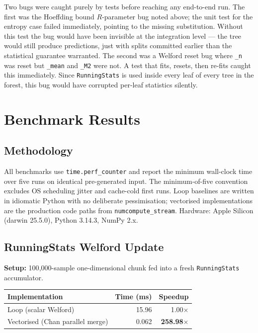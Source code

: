 \documentclass[10pt,a4paper]{article}
\begin{document}
Two bugs were caught purely by tests before reaching any end-to-end run. The first was the Hoeffding bound $R$-parameter bug noted above; the unit test for the entropy case failed immediately, pointing to the missing substitution. Without this test the bug would have been invisible at the integration level --- the tree would still produce predictions, just with splits committed earlier than the statistical guarantee warranted. The second was a Welford reset bug where \texttt{\_n} was reset but \texttt{\_mean} and \texttt{\_M2} were not. A test that fits, resets, then re-fits caught this immediately. Since \texttt{RunningStats} is used inside every leaf of every tree in the forest, this bug would have corrupted per-leaf statistics silently.

\section{Benchmark Results}

\subsection{Methodology}

All benchmarks use \texttt{time.perf\_counter} and report the minimum wall-clock time over five runs on identical pre-generated input. The minimum-of-five convention excludes OS scheduling jitter and cache-cold first runs. Loop baselines are written in idiomatic Python with no deliberate pessimisation; vectorised implementations are the production code paths from \texttt{numcompute\_stream}. Hardware: Apple Silicon (darwin 25.5.0), Python 3.14.3, NumPy 2.x.

\subsection{RunningStats Welford Update}

\textbf{Setup:} 100{,}000-sample one-dimensional chunk fed into a fresh \texttt{RunningStats} accumulator.

\begin{table}[h]
\centering
\footnotesize
\begin{tabular}{lrr}
\toprule
Implementation & Time (ms) & Speedup \\
\midrule
Loop (scalar Welford) & 15.96 & 1.00$\times$ \\
Vectorised (Chan parallel merge) & 0.062 & \textbf{258.98$\times$} \\
\bottomrule
\end{tabular}
\end{table}
\end{document}
